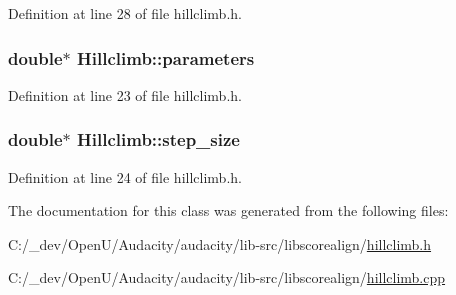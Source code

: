 Definition at line 28 of file hillclimb.\+h.

\subsubsection[{\texorpdfstring{parameters}{parameters}}]{\setlength{\rightskip}{0pt plus 5cm}double$\ast$ Hillclimb\+::parameters\hspace{0.3cm}{\ttfamily [protected]}}\hypertarget{class_hillclimb_a227a3569c5b207d4305a78028d59b4eb}{}\label{class_hillclimb_a227a3569c5b207d4305a78028d59b4eb}


Definition at line 23 of file hillclimb.\+h.

\subsubsection[{\texorpdfstring{step\+\_\+size}{step_size}}]{\setlength{\rightskip}{0pt plus 5cm}double$\ast$ Hillclimb\+::step\+\_\+size\hspace{0.3cm}{\ttfamily [protected]}}\hypertarget{class_hillclimb_a37c6e7bc6fad83fcc894ede5fb3baada}{}\label{class_hillclimb_a37c6e7bc6fad83fcc894ede5fb3baada}


Definition at line 24 of file hillclimb.\+h.



The documentation for this class was generated from the following files\+:\begin{DoxyCompactItemize}
\item 
C\+:/\+\_\+dev/\+Open\+U/\+Audacity/audacity/lib-\/src/libscorealign/\hyperlink{hillclimb_8h}{hillclimb.\+h}\item 
C\+:/\+\_\+dev/\+Open\+U/\+Audacity/audacity/lib-\/src/libscorealign/\hyperlink{hillclimb_8cpp}{hillclimb.\+cpp}\end{DoxyCompactItemize}
